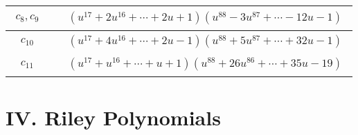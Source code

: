 \documentclass[1p]{elsarticle_modified}
\theoremstyle{definition}
\begin{document}
\begin{tabular}{m{50pt}|m{274pt}}
\hline $$\begin{aligned}c_{8},c_{9}\end{aligned}$$&$\begin{aligned}
&(u^{17}+2 u^{16}+\cdots+2 u+1)(u^{88}-3 u^{87}+\cdots-12 u-1)
\end{aligned}$\\
\hline $$\begin{aligned}c_{10}\end{aligned}$$&$\begin{aligned}
&(u^{17}+4 u^{16}+\cdots+2 u-1)(u^{88}+5 u^{87}+\cdots+32 u-1)
\end{aligned}$\\
\hline $$\begin{aligned}c_{11}\end{aligned}$$&$\begin{aligned}
&(u^{17}+u^{16}+\cdots+u+1)(u^{88}+26 u^{86}+\cdots+35 u-19)
\end{aligned}$\\
\hline
\end{tabular}\newpage\renewcommand{\arraystretch}{1}
\centering \section*{ IV. Riley Polynomials}
\end{document}
